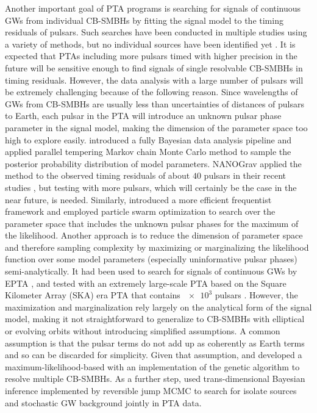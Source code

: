 \documentclass[times,tight]{aastex631}
\begin{document}
Another important goal of PTA programs is searching for signals of continuous GWs from individual CB-SMBHs by fitting the signal model to the timing residuals of pulsars.
Such searches have been conducted in multiple studies using a variety of methods, but no individual sources have been identified yet \citep{zhu2014, babak2016, aggarwal2019}.
It is expected that PTAs including more pulsars timed with higher precision in the future will be sensitive enough to find signals of single resolvable CB-SMBHs in timing residuals.
However, the data analysis with a large number of pulsars will be extremely challenging because of the following reason. 
Since wavelengths of GWs from CB-SMBHs are usually less than uncertainties of distances of pulsars to Earth, each pulsar in the PTA will introduce an unknown pulsar phase parameter in the signal model, making the dimension of the parameter space too high to explore easily.
\cite{ellis2013} introduced a fully Bayesian data analysis pipeline and applied parallel tempering Markov chain Monte Carlo \citep[MCMC, see][]{metropolis1953,hastings1970, swendsen1986, sharma2017} method to sample the posterior probability distribution of model parameters.
NANOGrav applied the method to the observed timing residuals of about $40$ pulsars in their recent studies \citep{aggarwal2019, arzoumanian202009}, but testing with more pulsars, which will certainly be the case in the near future, is needed.
Similarly, \cite{zhu2016} introduced a more efficient frequentist framework and employed particle swarm optimization \citep[PSO, see][]{eberhart1995,wang2010} to search over the parameter space that includes the unknown pulsar phases for the maximum of the likelihood.
Another approach is to reduce the dimension of parameter space and therefore sampling complexity by maximizing \citep{ellis2012,babak2012,wang2015} or marginalizing \citep{taylor2014, wang2017} the likelihood function over some model parameters (especially uninformative pulsar phases) semi-analytically.
It had been used to search for signals of continuous GWs by EPTA \citep{babak2016}, and tested with an extremely large-scale PTA based on the Square Kilometer Array (SKA) era PTA that contains $\num{e3}$ pulsars \citep{wang201704}.
However, the maximization and marginalization rely largely on the analytical form of the signal model, making it not straightforward to generalize to CB-SMBHs with elliptical or evolving orbits without introducing simplified assumptions.
A common assumption is that the pulsar terms do not add up as coherently as Earth terms and so can be discarded for simplicity.
Given that assumption, \cite{babak2012} and \cite{petiteau2013} developed a maximum-likelihood-based with an implementation of the genetic algorithm \citep{holland1975}  to resolve multiple CB-SMBHs.
As a further step, \cite{becsy2020} used trans-dimensional Bayesian inference 
implemented by reversible jump MCMC \citep{green1995} to search for isolate sources and stochastic GW background jointly in PTA data.
\end{document}
